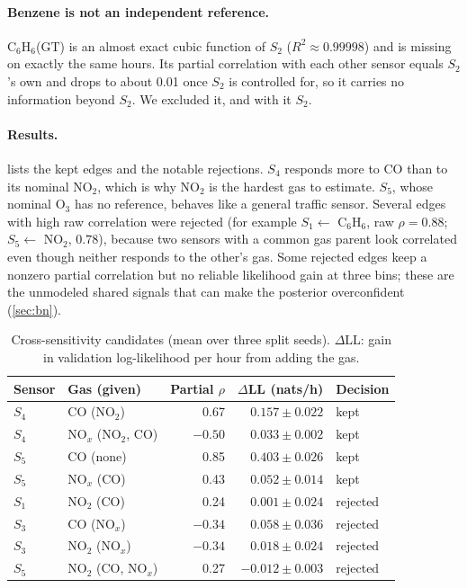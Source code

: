 \paragraph{Benzene is not an independent reference.} C$_6$H$_6$(GT) is an
almost exact cubic function of $S_2$ ($R^2 \approx 0.99998$) and is missing on
exactly the same hours. Its partial correlation with each other sensor equals
$S_2$'s own and drops to about 0.01 once $S_2$ is controlled for, so it carries
no information beyond $S_2$. We excluded it, and with it $S_2$.

\paragraph{Results.}  lists the kept edges and the notable
rejections. $S_4$ responds more to CO than to its nominal NO$_2$, which is why
NO$_2$ is the hardest gas to estimate. $S_5$, whose nominal O$_3$ has no
reference, behaves like a general traffic sensor. Several edges with high raw
correlation were rejected (for example $S_1 \leftarrow$ C$_6$H$_6$, raw
$\rho = 0.88$; $S_5 \leftarrow$ NO$_2$, $0.78$), because two sensors with a
common gas parent look correlated even though neither responds to the other's
gas. Some rejected edges keep a nonzero partial correlation but no reliable
likelihood gain at three bins; these are the unmodeled shared signals that can
make the posterior overconfident (\cref{sec:bn}).

\begin{table}[h]
  \centering
  \caption{Cross-sensitivity candidates (mean over three split seeds).
  $\Delta$LL: gain in validation log-likelihood per hour from adding the gas.}
  \label{tab:cross}
  \begin{tabular}{llrrl}
    \toprule
    Sensor & Gas (given) & Partial $\rho$ & $\Delta$LL (nats/h) & Decision \\
    \midrule
    $S_4$ & CO (NO$_2$)             & 0.67  & $0.157 \pm 0.022$ & kept \\
    $S_4$ & NO$_x$ (NO$_2$, CO)     & $-0.50$ & $0.033 \pm 0.002$ & kept \\
    $S_5$ & CO (none)               & 0.85  & $0.403 \pm 0.026$ & kept \\
    $S_5$ & NO$_x$ (CO)             & 0.43  & $0.052 \pm 0.014$ & kept \\
    \midrule
    $S_1$ & NO$_2$ (CO)             & 0.24  & $0.001 \pm 0.024$ & rejected \\
    $S_3$ & CO (NO$_x$)             & $-0.34$ & $0.058 \pm 0.036$ & rejected \\
    $S_3$ & NO$_2$ (NO$_x$)         & $-0.34$ & $0.018 \pm 0.024$ & rejected \\
    $S_5$ & NO$_2$ (CO, NO$_x$)     & 0.27  & $-0.012 \pm 0.003$ & rejected \\
    \bottomrule
  \end{tabular}
\end{table}

